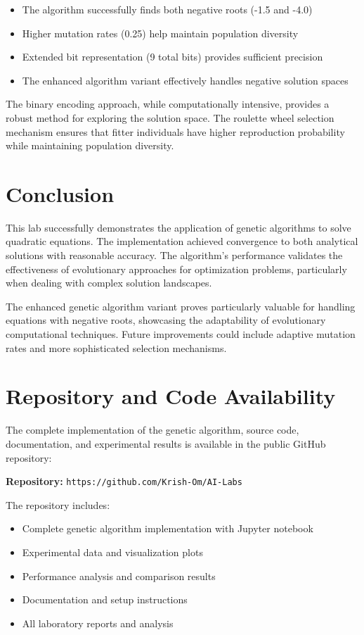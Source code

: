 \documentclass[11pt,a4paper]{article}
\begin{document}
\begin{itemize}
\item The algorithm successfully finds both negative roots (-1.5 and -4.0)
\item Higher mutation rates (0.25) help maintain population diversity
\item Extended bit representation (9 total bits) provides sufficient precision
\item The enhanced algorithm variant effectively handles negative solution spaces
\end{itemize}

The binary encoding approach, while computationally intensive, provides a robust method for exploring the solution space. The roulette wheel selection mechanism ensures that fitter individuals have higher reproduction probability while maintaining population diversity.

\section{Conclusion}

This lab successfully demonstrates the application of genetic algorithms to solve quadratic equations. The implementation achieved convergence to both analytical solutions with reasonable accuracy. The algorithm's performance validates the effectiveness of evolutionary approaches for optimization problems, particularly when dealing with complex solution landscapes.

The enhanced genetic algorithm variant proves particularly valuable for handling equations with negative roots, showcasing the adaptability of evolutionary computational techniques. Future improvements could include adaptive mutation rates and more sophisticated selection mechanisms.

\section{Repository and Code Availability}

The complete implementation of the genetic algorithm, source code, documentation, and experimental results is available in the public GitHub repository:

\textbf{Repository:} \texttt{https://github.com/Krish-Om/AI-Labs}

The repository includes:
\begin{itemize}
\item Complete genetic algorithm implementation with Jupyter notebook
\item Experimental data and visualization plots
\item Performance analysis and comparison results
\item Documentation and setup instructions
\item All laboratory reports and analysis
\end{itemize}
\end{document}
